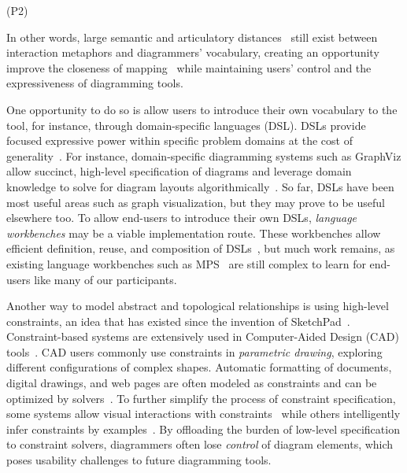      (P2)
    
In other words, large semantic and articulatory distances~\cite{DM-Seminal} still exist between interaction metaphors and diagrammers' vocabulary, creating an opportunity improve the closeness of mapping~\cite{green_usability_1996} while maintaining users' control and the expressiveness of diagramming tools. 

One opportunity to do so is allow users to introduce their own vocabulary to the tool, for instance, through domain-specific languages (DSL). DSLs provide focused expressive power within specific problem domains at the cost of generality~\cite{DSLAnnotated}. For instance, domain-specific diagramming systems such as GraphViz allow succinct, high-level specification of diagrams and leverage domain knowledge to solve for diagram layouts algorithmically~\cite{Graphviz}. So far, DSLs have been most useful areas such as graph visualization, but they may prove to be useful elsewhere too. To allow end-users to introduce their own DSLs,   \emph{language workbenches} may be a viable implementation route. These workbenches allow efficient definition, reuse, and composition of DSLs~\cite{stateLanguageWorkbench}, but much work remains, as existing language workbenches such as MPS~\cite{MPS} are still complex to learn for end-users like many of our participants. 

Another way to model abstract and topological relationships is using high-level constraints, an idea that has existed since the invention of SketchPad~\cite{sketchpad}. Constraint-based systems are extensively used in Computer-Aided Design (CAD) tools~\cite{constraintsCAD}. CAD users commonly use constraints in \emph{parametric drawing}, exploring different configurations of complex shapes. Automatic formatting of documents, digital drawings, and web pages are often modeled as constraints and can be optimized by solvers~\cite{DocumentFormatting, euclase}. To further simplify the process of constraint specification, some systems allow visual interactions with constraints~\cite{PBMLayout, DrawingWithConstraints} while others intelligently infer constraints by examples~\cite{InferringConstraintsFromMultipleSnapshots}. By offloading the burden of low-level specification to constraint solvers, diagrammers often lose \emph{control} of diagram elements, which poses usability challenges to future diagramming tools.


